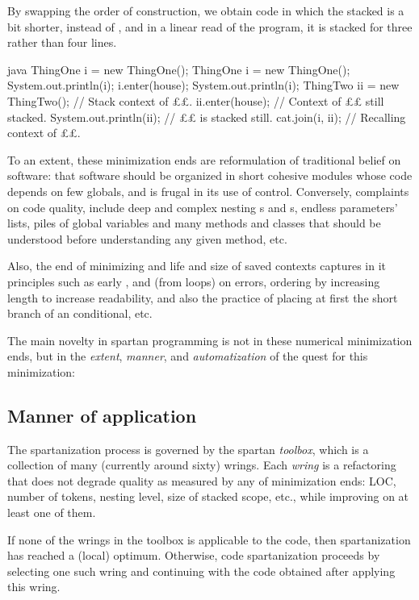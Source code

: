 \begin{enumerate}
  By swapping the order of construction, we obtain code in which the stacked is
  a bit shorter,  instead of , and in a linear read of the
  program, it is stacked for three rather than four lines.
 
\begin{code}[minipage,width=54ex]{java} 
ThingOne i = new ThingOne();
ThingOne i = new ThingOne(); 
System.out.println(i); 
i.enter(house); 
System.out.println(i);        
ThingTwo ii = new ThingTwo(); // Stack context of ££. 
ii.enter(house);              // Context of ££ still stacked.
System.out.println(ii);       // ££ is stacked still.  
cat.join(i, ii);              // Recalling context of ££.
  \end{code}
\end{enumerate}

To an extent, these minimization ends are reformulation of traditional
belief on software: that software should be organized in short cohesive modules
whose code depends on few globals, and is frugal in its use of control.
Conversely, complaints on code quality, include deep and complex nesting
s and s, endless parameters' lists, piles of global variables
and many methods and classes that should be understood before understanding any
given method, etc.

Also, the end of minimizing and life and size of saved contexts captures in it
principles such as early ,  and  (from loops) on
errors, ordering by increasing length to increase readability, and also the
practice of placing at first the short branch of an  conditional, etc.

The main novelty in spartan programming is not in these numerical minimization
ends, but in the \emph{extent}, \emph{manner}, and \emph{automatization} of the
quest for this minimization:

\subsection{Manner of application}
The spartanization process is governed by the spartan
\emph{toolbox}, which is a collection of many (currently around sixty)
wrings.  Each \emph{wring} is a refactoring that does not degrade quality as
measured by any of minimization ends: LOC, number of tokens, nesting level,
size of stacked scope, etc., while improving on at least one of them.

If none of the wrings in the toolbox is applicable to the code, then
spartanization has reached a (local) optimum. Otherwise, code spartanization
proceeds by selecting one such wring and continuing with the code obtained
after applying this wring.

